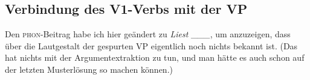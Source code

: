 \documentclass[10pt,a3paper]{article}
\newcommand{\rot}[1]{\textcolor{rot}{#1}}
\newcommand{\blau}[1]{\textcolor{blau}{#1}}
\newcommand{\gruen}[1]{\textcolor{gruen}{#1}}
\newcommand{\orongsch}[1]{\textcolor{orongsch}{#1}}
\newcommand{\tuerkis}[1]{\textcolor{tuerkis}{#1}}
\begin{document}

\subsection{Verbindung des V1-Verbs mit der VP}\label{sec:top}

Den \textsc{phon}-Beitrag habe ich hier geändert zu \textit{Liest \_\_\_}, um anzuzeigen, dass über die Lautgestalt der gespurten VP eigentlich noch nichts bekannt ist.
(Das hat nichts mit der Argumentextraktion zu tun, und man hätte es auch schon auf der letzten Musterlösung so machen können.)
\end{document}
